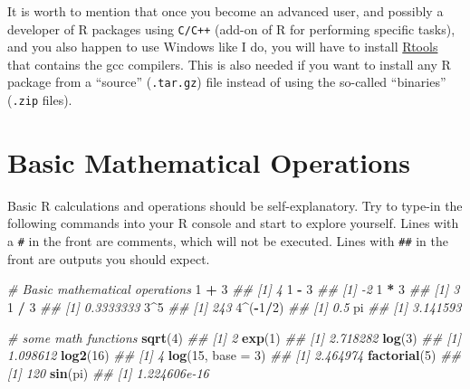\documentclass[
]{book}
\newenvironment{Shaded}{\begin{snugshade}}{\end{snugshade}}
\newcommand{\CommentTok}[1]{\textcolor[rgb]{0.56,0.35,0.01}{\textit{#1}}}
\newcommand{\DataTypeTok}[1]{\textcolor[rgb]{0.13,0.29,0.53}{#1}}
\newcommand{\DecValTok}[1]{\textcolor[rgb]{0.00,0.00,0.81}{#1}}
\newcommand{\KeywordTok}[1]{\textcolor[rgb]{0.13,0.29,0.53}{\textbf{#1}}}
\newcommand{\NormalTok}[1]{#1}
\newcommand{\OperatorTok}[1]{\textcolor[rgb]{0.81,0.36,0.00}{\textbf{#1}}}
\newcommand{\StringTok}[1]{\textcolor[rgb]{0.31,0.60,0.02}{#1}}
\begin{document}
It is worth to mention that once you become an advanced user, and possibly a developer of R packages using \texttt{C/C++} (add-on of R for performing specific tasks), and you also happen to use Windows like I do, you will have to install \href{https://cran.r-project.org/bin/windows/Rtools/}{Rtools} that contains the gcc compilers. This is also needed if you want to install any R package from a ``source'' (\texttt{.tar.gz}) file instead of using the so-called ``binaries'' (\texttt{.zip} files).

\hypertarget{basic-mathematical-operations}{%
\section{Basic Mathematical Operations}\label{basic-mathematical-operations}}

Basic R calculations and operations should be self-explanatory. Try to type-in the following commands into your R console and start to explore yourself. Lines with a \texttt{\#} in the front are comments, which will not be executed. Lines with \texttt{\#\#} in the front are outputs you should expect.

\begin{Shaded}
\begin{Highlighting}[]
  \CommentTok{# Basic mathematical operations}
  \DecValTok{1} \OperatorTok{+}\StringTok{ }\DecValTok{3}
\CommentTok{## [1] 4}
  \DecValTok{1} \OperatorTok{-}\StringTok{ }\DecValTok{3}
\CommentTok{## [1] -2}
  \DecValTok{1} \OperatorTok{*}\StringTok{ }\DecValTok{3}
\CommentTok{## [1] 3}
  \DecValTok{1} \OperatorTok{/}\StringTok{ }\DecValTok{3}
\CommentTok{## [1] 0.3333333}
  \DecValTok{3}\OperatorTok{^}\DecValTok{5}
\CommentTok{## [1] 243}
  \DecValTok{4}\OperatorTok{^}\NormalTok{(}\OperatorTok{-}\DecValTok{1}\OperatorTok{/}\DecValTok{2}\NormalTok{)}
\CommentTok{## [1] 0.5}
\NormalTok{  pi}
\CommentTok{## [1] 3.141593}
  
  \CommentTok{# some math functions}
  \KeywordTok{sqrt}\NormalTok{(}\DecValTok{4}\NormalTok{)}
\CommentTok{## [1] 2}
  \KeywordTok{exp}\NormalTok{(}\DecValTok{1}\NormalTok{)}
\CommentTok{## [1] 2.718282}
  \KeywordTok{log}\NormalTok{(}\DecValTok{3}\NormalTok{)}
\CommentTok{## [1] 1.098612}
  \KeywordTok{log2}\NormalTok{(}\DecValTok{16}\NormalTok{)}
\CommentTok{## [1] 4}
  \KeywordTok{log}\NormalTok{(}\DecValTok{15}\NormalTok{, }\DataTypeTok{base =} \DecValTok{3}\NormalTok{)}
\CommentTok{## [1] 2.464974}
  \KeywordTok{factorial}\NormalTok{(}\DecValTok{5}\NormalTok{)}
\CommentTok{## [1] 120}
  \KeywordTok{sin}\NormalTok{(pi)}
\CommentTok{## [1] 1.224606e-16}
\end{Highlighting}
\end{Shaded}
\end{document}
